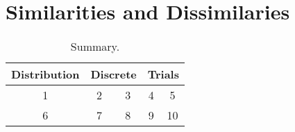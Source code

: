 \documentclass{article} %
\begin{document}
\section*{Similarities and Dissimilaries}
\begin{table}[h!]
\begin{center}
\renewcommand{\arraystretch}{1.5}
\begin{tabular}{ccccc} \hline
Distribution & \multicolumn{2}{c}{Discrete} & \multicolumn{2}{c}{Trials}  \\ \hline
1 & 2 & 3 & 4 & 5 \\
6 & 7 & 8 & 9 & 10 \\
\hline
\end{tabular}
\caption{Summary.}
\label{Ta:comp}
\end{center}
\end{table}
\end{document}
